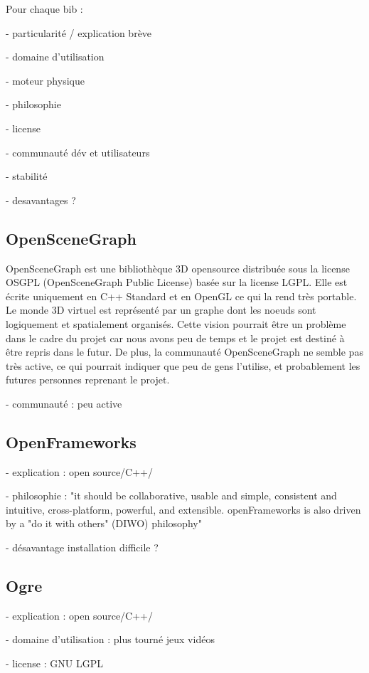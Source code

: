 Pour chaque bib : 

- particularité / explication brève

- domaine d'utilisation

- moteur physique 

- philosophie

- license

- communauté dév et utilisateurs

- stabilité

- desavantages ?

\subsection{OpenSceneGraph}

OpenSceneGraph est une bibliothèque 3D opensource distribuée sous la license OSGPL (OpenSceneGraph Public License) basée sur la license LGPL. Elle est écrite uniquement en C++ Standard et en OpenGL ce qui la rend très portable. \\
Le monde 3D virtuel est représenté par un graphe dont les noeuds sont logiquement et spatialement organisés. Cette vision pourrait être un problème dans le cadre du projet car nous avons peu de temps et le projet est destiné à être repris dans le futur. De plus, la communauté OpenSceneGraph ne semble pas très active, ce qui pourrait indiquer que peu de gens l'utilise, et probablement les futures personnes reprenant le projet. 

- communauté : peu active

\subsection{OpenFrameworks}
- explication : open source/C++/

- philosophie : "it should be collaborative, usable and simple, consistent and intuitive, cross-platform, powerful, and extensible. openFrameworks is also driven by a "do it with others" (DIWO) philosophy"

- désavantage installation difficile ?


\subsection{Ogre}
- explication : open source/C++/

- domaine d'utilisation :  plus tourné jeux vidéos 

- license : GNU LGPL \\

